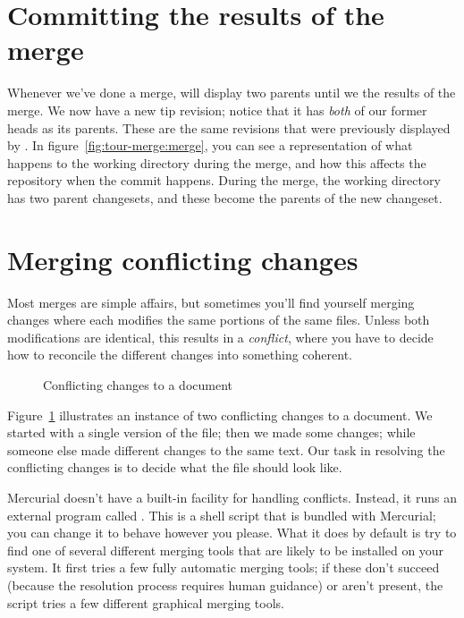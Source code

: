 \section{Committing the results of the merge}

Whenever we've done a merge,  will display two parents
until we  the results of the merge.
We now have a new tip revision; notice that it has \emph{both} of
our former heads as its parents.  These are the same revisions that
were previously displayed by .
In figure~\ref{fig:tour-merge:merge}, you can see a representation of
what happens to the working directory during the merge, and how this
affects the repository when the commit happens.  During the merge, the
working directory has two parent changesets, and these become the
parents of the new changeset.

\section{Merging conflicting changes}

Most merges are simple affairs, but sometimes you'll find yourself
merging changes where each modifies the same portions of the same
files.  Unless both modifications are identical, this results in a
\emph{conflict}, where you have to decide how to reconcile the
different changes into something coherent.

\begin{figure}[ht]
  \centering
  \caption{Conflicting changes to a document}
  \label{fig:tour-merge:conflict}
\end{figure}

Figure~\ref{fig:tour-merge:conflict} illustrates an instance of two
conflicting changes to a document.  We started with a single version
of the file; then we made some changes; while someone else made
different changes to the same text.  Our task in resolving the
conflicting changes is to decide what the file should look like.

Mercurial doesn't have a built-in facility for handling conflicts.
Instead, it runs an external program called .  This
is a shell script that is bundled with Mercurial; you can change it to
behave however you please.  What it does by default is try to find one
of several different merging tools that are likely to be installed on
your system.  It first tries a few fully automatic merging tools; if
these don't succeed (because the resolution process requires human
guidance) or aren't present, the script tries a few different
graphical merging tools.

